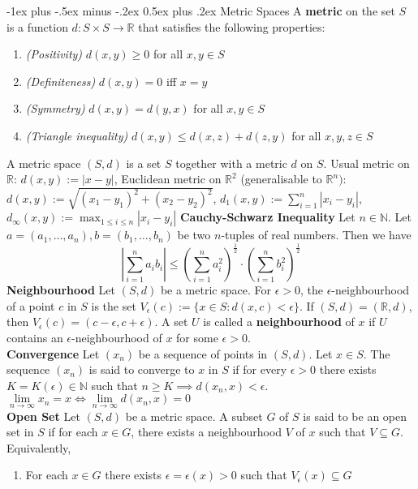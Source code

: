 \documentclass[10pt,landscape]{article}
\makeatletter
\renewcommand{\section}{\@startsection{section}{1}{0mm}%
                                {-1ex plus -.5ex minus -.2ex}%
                                {0.5ex plus .2ex}%
                                {\normalfont\large\bfseries}}
\makeatother
\begin{document}
\begin{multicols}{3}
\section{Metric Spaces}
A \textbf{metric} on the set $S$ is a function  $d:S\times S\to\mathbb{R}$ that satisfies the following properties:
 \begin{enumerate}
	 \item \textit{(Positivity)} $d(x,y)\geq 0$ for all $x,y\in S$
	\item \textit{(Definiteness)} $d(x,y)=0$ iff  $x=y$
	\item \textit{(Symmetry)}  $d(x,y)=d(y,x)$ for all $x,y\in S$
	\item \textit{(Triangle inequality)}  $d(x,y)\leq d(x,z)+d(z,y)$ for all  $x,y,z\in S$
\end{enumerate} A metric space $(S,d)$ is a set  $S$ together with a metric  $d$ on  $S$.
Usual metric on $\mathbb{R}$: $d(x,y):=|x-y|$, Euclidean metric on $\mathbb{R}^2$ (generalisable to $\mathbb{R}^n)$:  $d(x,y):=\sqrt{(x_1-y_1)^2+(x_2-y_2)^2}$, $d_1(x,y):=\sum_{i=1}^n|x_i-y_i|$, $d_\infty(x,y):=\max_{1\leq i\leq n}|x_i-y_i|$
\textbf{Cauchy-Schwarz Inequality} Let $n\in\mathbb{N}$. Let  $a=(a_1,\dots,a_n), b=(b_1,\dots,b_n)$ be two $n$-tuples of real numbers. Then we have
\[
	\left|\sum_{i=1}^n a_i b_i\right|\leq\left(\sum_{i=1}^n a_i^2\right)^{\frac{1}{2}}\cdot\left(\sum_{i=1}^n b_i^2\right)^{\frac{1}{2}}
\]
\textbf{Neighbourhood} Let $(S,d)$ be a metric space. For  $\epsilon>0$, the  $\epsilon$-neighbourhood of a point  $c$ in  $S$ is the set  $V_\epsilon(c):=\{x\in S:d(x,c)<\epsilon\}$. If  $(S,d)=(\mathbb{R},d)$, then  $V_\epsilon(c)=(c-\epsilon,c+\epsilon)$. A set $U$ is called a \textbf{neighbourhood} of  $x$ if  $U$ contains an  $\epsilon$-neighbourhood of  $x$ for some  $\epsilon>0$.\\
\textbf{Convergence} Let $(x_n)$ be a sequence of points in  $(S,d)$. Let  $x\in S$. The sequence  $(x_n)$ is said to converge to  $x$ in  $S$ if for every  $\epsilon>0$ there exists  $K=K(\epsilon)\in\mathbb{N}$ such that  $n\geq K\implies d(x_n,x)<\epsilon$.\\
$\lim\limits_{n\to\infty}x_n=x\iff\lim\limits_{n\to\infty}d(x_n,x)=0$\\
\textbf{Open Set} Let $(S,d)$ be a metric space. A subset  $G$ of  $S$ is said to be an open set in  $S$ if for each  $x\in G$, there exists a neighbourhood  $V$ of  $x$ such that  $V\subseteq G$. Equivalently,
 \begin{enumerate}
	 \item For each $x\in G$ there exists  $\epsilon=\epsilon(x)>0$ such that  $V_\epsilon(x)\subseteq G$

\end{enumerate}
\end{multicols}
\end{document}
